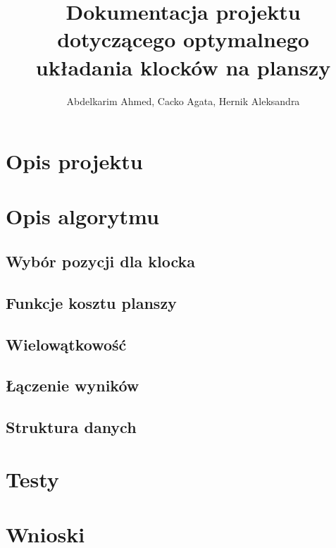 \documentclass{article}
\title{Dokumentacja projektu dotyczącego optymalnego układania klocków na planszy}
\author{Abdelkarim Ahmed, Cacko Agata, Hernik Aleksandra}
\begin{document}
\maketitle
\section{Opis projektu}
\section{Opis algorytmu}
\subsection{Wybór pozycji dla klocka}
\subsection{Funkcje kosztu planszy}
\subsection{Wielowątkowość}
\subsection{Łączenie wyników}
\subsection{Struktura danych}
\section{Testy}
\section{Wnioski} %
\end{document}
